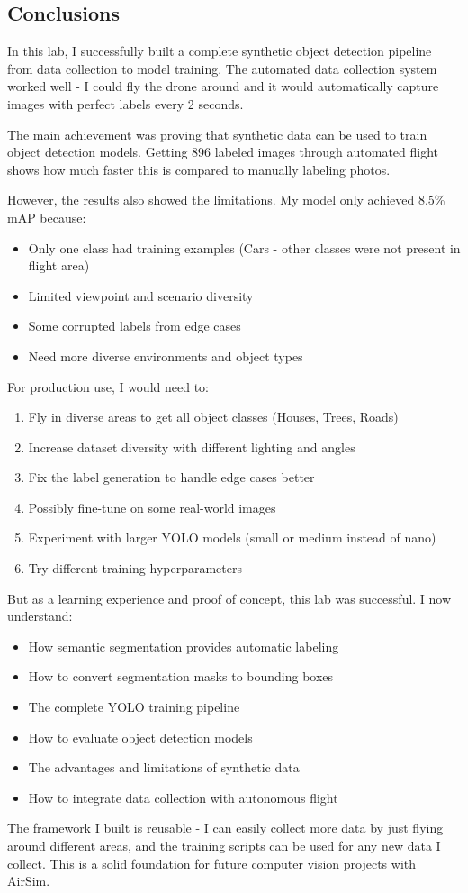 \subsection{Conclusions}

In this lab, I successfully built a complete synthetic object detection pipeline from data collection to model training. The automated data collection system worked well - I could fly the drone around and it would automatically capture images with perfect labels every 2 seconds.

The main achievement was proving that synthetic data can be used to train object detection models. Getting 896 labeled images through automated flight shows how much faster this is compared to manually labeling photos.

However, the results also showed the limitations. My model only achieved 8.5\% mAP because:
\begin{itemize}
	\item Only one class had training examples (Cars - other classes were not present in flight area)
	\item Limited viewpoint and scenario diversity
	\item Some corrupted labels from edge cases
	\item Need more diverse environments and object types
\end{itemize}

For production use, I would need to:
\begin{enumerate}
	\item Fly in diverse areas to get all object classes (Houses, Trees, Roads)
	\item Increase dataset diversity with different lighting and angles
	\item Fix the label generation to handle edge cases better
	\item Possibly fine-tune on some real-world images
	\item Experiment with larger YOLO models (small or medium instead of nano)
	\item Try different training hyperparameters
\end{enumerate}

But as a learning experience and proof of concept, this lab was successful. I now understand:
\begin{itemize}
	\item How semantic segmentation provides automatic labeling
	\item How to convert segmentation masks to bounding boxes
	\item The complete YOLO training pipeline
	\item How to evaluate object detection models
	\item The advantages and limitations of synthetic data
	\item How to integrate data collection with autonomous flight
\end{itemize}

The framework I built is reusable - I can easily collect more data by just flying around different areas, and the training scripts can be used for any new data I collect. This is a solid foundation for future computer vision projects with AirSim.

\clearpage
